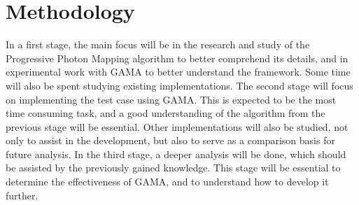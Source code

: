 \section{Methodology}

In a first stage, the main focus will be in the research and study of the Progressive Photon Mapping algorithm to better comprehend its details, and in experimental work with GAMA to better understand the framework. Some time will also be spent studying existing implementations.
The second stage will focus on implementing the test case using GAMA. This is expected to be the most time consuming task, and a good understanding of the algorithm from the previous stage will be essential.  Other implementations will also be studied, not only to assist in the development, but also to serve as a comparison basis for future analysis.
  In the third stage, a deeper analysis will be done, which should be assisted by the previously gained knowledge. This stage will be essential to determine the effectiveness of GAMA, and to understand how to develop it further.
